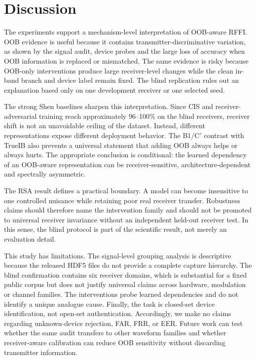 \section{Discussion}
\label{sec:discussion}
The experiments support a mechanism-level interpretation of OOB-aware RFFI. OOB evidence is useful because it contains transmitter-discriminative variation, as shown by the signal audit, device probes and the large loss of accuracy when OOB information is replaced or mismatched. The same evidence is risky because OOB-only interventions produce large receiver-level changes while the clean in-band branch and device label remain fixed. The blind replication rules out an explanation based only on one development receiver or one selected seed.

The strong Shen baselines sharpen this interpretation. Since CIS and receiver-adversarial training reach approximately 96--100\% on the blind receivers, receiver shift is not an unavoidable ceiling of the dataset. Instead, different representations expose different deployment behavior. The B1/C$'$ contrast with TrueIB also prevents a universal statement that adding OOB always helps or always hurts. The appropriate conclusion is conditional: the learned dependency of an OOB-aware representation can be receiver-sensitive, architecture-dependent and spectrally asymmetric.

The RSA result defines a practical boundary. A model can become insensitive to one controlled nuisance while retaining poor real receiver transfer. Robustness claims should therefore name the intervention family and should not be promoted to universal receiver invariance without an independent held-out receiver test. In this sense, the blind protocol is part of the scientific result, not merely an evaluation detail.

This study has limitations. The signal-level grouping analysis is descriptive because the released HDF5 files do not provide a complete capture hierarchy. The blind confirmation contains six receiver domains, which is substantial for a fixed public corpus but does not justify universal claims across hardware, modulation or channel families. The interventions probe learned dependencies and do not identify a unique analogue cause. Finally, the task is closed-set device identification, not open-set authentication. Accordingly, we make no claims regarding unknown-device rejection, FAR, FRR, or EER. Future work can test whether the same audit transfers to other waveform families and whether receiver-aware calibration can reduce OOB sensitivity without discarding transmitter information.
